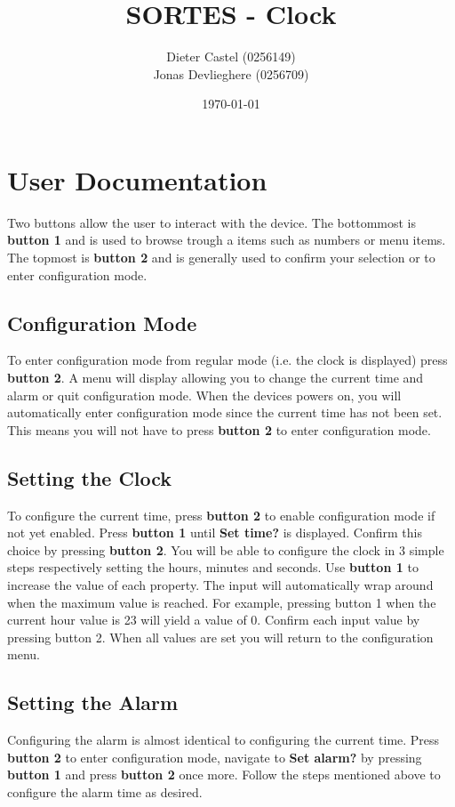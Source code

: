 \documentclass[11pt]{article}
\title{SORTES - Clock}
\author{Dieter Castel (0256149) \\ Jonas Devlieghere (0256709)}
\date{\today}
\newcommand{\io}[1]{\textbf{#1}}
\begin{document}
\maketitle
\newpage

\tableofcontents
\newpage

\section{User Documentation}
Two buttons allow the user to interact with the device. 
The bottommost is \io{button 1} and is used to browse trough a items such as numbers or menu items.
The topmost is \io{button 2} and is generally used to confirm your selection or to enter configuration mode.

\subsection{Configuration Mode}
To enter configuration mode from regular mode (i.e. the clock is displayed) press \io{button 2}. 
A menu will display allowing you to change the current time and alarm or quit configuration mode.
When the devices powers on, you will automatically enter configuration mode since the current time has not been set. 
This means you will not have to press \io{button 2} to enter configuration mode. 

\subsection{Setting the Clock}
To configure the current time, press \io{button 2} to enable configuration mode if not yet enabled. 
Press \io{button 1} until \io{Set time?} is displayed. 
Confirm this choice by pressing \io{button 2}.
You will be able to configure the clock in 3 simple steps respectively setting the hours, minutes and seconds. 
Use \io{button 1} to increase the value of each property. 
The input will automatically wrap around when the maximum value is reached.
For example, pressing {button 1} when the current hour value is 23 will yield a value of 0. 
Confirm each input value by pressing {button 2}. When all values are set you will return to the configuration menu.

\subsection{Setting the Alarm}
Configuring the alarm is almost identical to configuring the current time. Press \io{button 2} to enter configuration mode, navigate to \io{Set alarm?} by pressing \io{button 1} and press \io{button 2} once more. 
Follow the steps mentioned above to configure the alarm time as desired.
\end{document}
